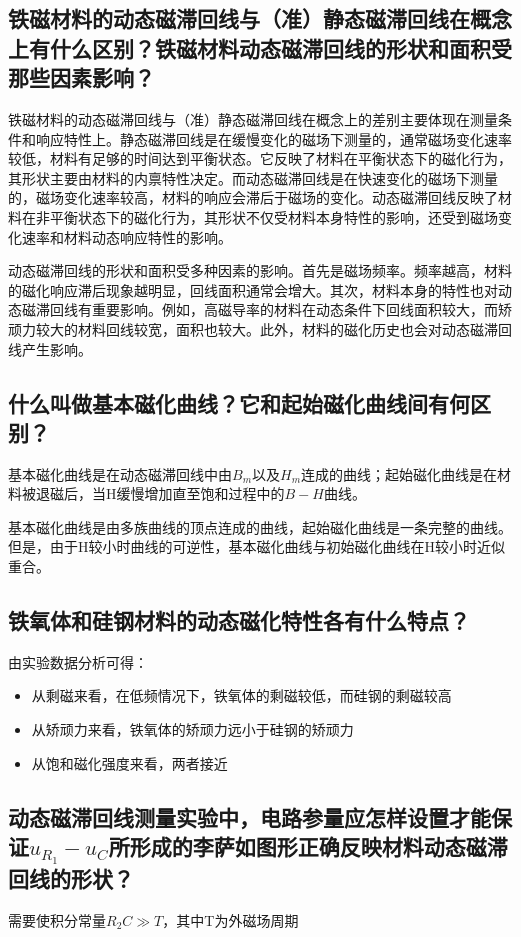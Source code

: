 \documentclass[11pt]{article}
\begin{document}
	\subsection{铁磁材料的动态磁滞回线与（准）静态磁滞回线在概念上有什么区别？铁磁材料动态磁滞回线的形状和面积受那些因素影响？}
	铁磁材料的动态磁滞回线与（准）静态磁滞回线在概念上的差别主要体现在测量条件和响应特性上。静态磁滞回线是在缓慢变化的磁场下测量的，通常磁场变化速率较低，材料有足够的时间达到平衡状态。它反映了材料在平衡状态下的磁化行为，其形状主要由材料的内禀特性决定。而动态磁滞回线是在快速变化的磁场下测量的，磁场变化速率较高，材料的响应会滞后于磁场的变化。动态磁滞回线反映了材料在非平衡状态下的磁化行为，其形状不仅受材料本身特性的影响，还受到磁场变化速率和材料动态响应特性的影响。
	
	动态磁滞回线的形状和面积受多种因素的影响。首先是磁场频率。频率越高，材料的磁化响应滞后现象越明显，回线面积通常会增大。其次，材料本身的特性也对动态磁滞回线有重要影响。例如，高磁导率的材料在动态条件下回线面积较大，而矫顽力较大的材料回线较宽，面积也较大。此外，材料的磁化历史也会对动态磁滞回线产生影响。
	
	\subsection{什么叫做基本磁化曲线？它和起始磁化曲线间有何区别？}
	基本磁化曲线是在动态磁滞回线中由$B_m$以及$H_m$连成的曲线；起始磁化曲线是在材料被退磁后，当H缓慢增加直至饱和过程中的$B-H$曲线。
	
	基本磁化曲线是由多族曲线的顶点连成的曲线，起始磁化曲线是一条完整的曲线。但是，由于H较小时曲线的可逆性，基本磁化曲线与初始磁化曲线在H较小时近似重合。
	
	\subsection{铁氧体和硅钢材料的动态磁化特性各有什么特点？}
	由实验数据分析可得：
	\begin{itemize}
		\item 从剩磁来看，在低频情况下，铁氧体的剩磁较低，而硅钢的剩磁较高
		\item 从矫顽力来看，铁氧体的矫顽力远小于硅钢的矫顽力
		\item 从饱和磁化强度来看，两者接近
	\end{itemize}

	\subsection{动态磁滞回线测量实验中，电路参量应怎样设置才能保证$u_{R_1}-u_C$所形成的李萨如图形正确反映材料动态磁滞回线的形状？}
	需要使积分常量$R_2 C \gg T$，其中T为外磁场周期
	
\end{document}
